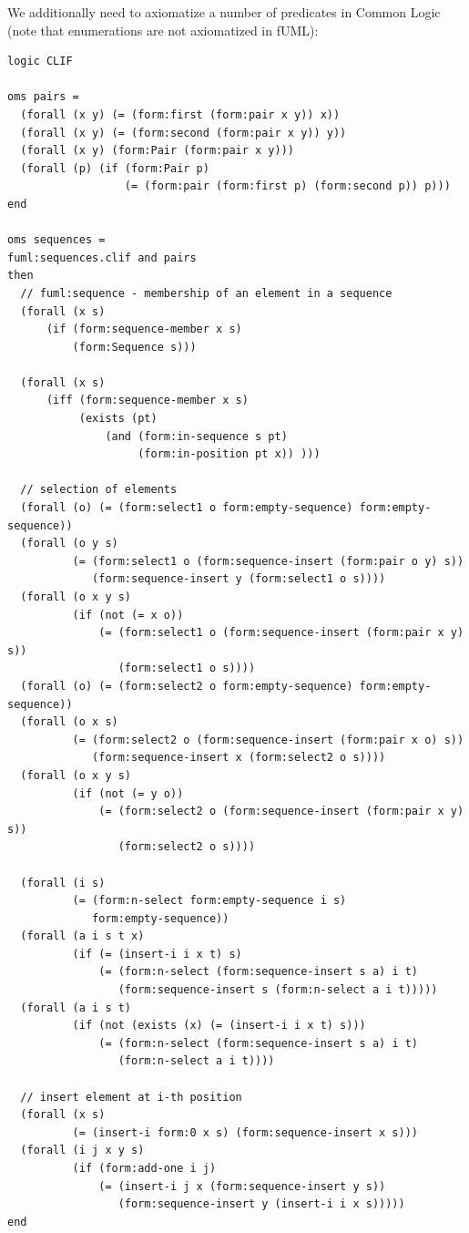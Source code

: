 \documentclass[10pt,fleqn,%
\ifpretendfinal
final%
\else
draft%
\fi,
]{scrreprt}
\begin{document}
We additionally need to axiomatize a number of predicates in Common Logic
(note that enumerations are not axiomatized in fUML):
\begin{lstlisting}[language=clif,morekeywords={then,with,logic,oms,end},mathescape]
logic CLIF

oms pairs =
  (forall (x y) (= (form:first (form:pair x y)) x))
  (forall (x y) (= (form:second (form:pair x y)) y))
  (forall (x y) (form:Pair (form:pair x y)))
  (forall (p) (if (form:Pair p)
                  (= (form:pair (form:first p) (form:second p)) p)))
end

oms sequences =
fuml:sequences.clif and pairs
then
  // fuml:sequence - membership of an element in a sequence
  (forall (x s)
      (if (form:sequence-member x s)
          (form:Sequence s)))

  (forall (x s)
      (iff (form:sequence-member x s)
           (exists (pt) 
               (and (form:in-sequence s pt)
                    (form:in-position pt x)) )))

  // selection of elements
  (forall (o) (= (form:select1 o form:empty-sequence) form:empty-sequence))
  (forall (o y s)
          (= (form:select1 o (form:sequence-insert (form:pair o y) s)) 
             (form:sequence-insert y (form:select1 o s))))
  (forall (o x y s)
          (if (not (= x o))
              (= (form:select1 o (form:sequence-insert (form:pair x y) s)) 
                 (form:select1 o s))))
  (forall (o) (= (form:select2 o form:empty-sequence) form:empty-sequence))
  (forall (o x s)
          (= (form:select2 o (form:sequence-insert (form:pair x o) s)) 
             (form:sequence-insert x (form:select2 o s))))
  (forall (o x y s)
          (if (not (= y o))
              (= (form:select2 o (form:sequence-insert (form:pair x y) s)) 
                 (form:select2 o s))))

  (forall (i s)
          (= (form:n-select form:empty-sequence i s) 
             form:empty-sequence))
  (forall (a i s t x)
          (if (= (insert-i i x t) s)
              (= (form:n-select (form:sequence-insert s a) i t)
                 (form:sequence-insert s (form:n-select a i t)))))
  (forall (a i s t)
          (if (not (exists (x) (= (insert-i i x t) s)))
              (= (form:n-select (form:sequence-insert s a) i t)
                 (form:n-select a i t))))

  // insert element at i-th position
  (forall (x s)
          (= (insert-i form:0 x s) (form:sequence-insert x s)))
  (forall (i j x y s)
          (if (form:add-one i j)
              (= (insert-i j x (form:sequence-insert y s))
                 (form:sequence-insert y (insert-i i x s)))))
end


\end{lstlisting}
\end{document}
